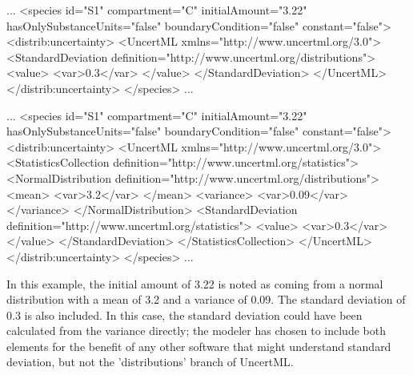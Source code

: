 \documentclass[draftspec]{sbmlpkgspec}
\newcommand{\uncertml}{UncertML\xspace}
\begin{document}
\begin{example}
...
      <species id="S1" compartment="C" initialAmount="3.22" hasOnlySubstanceUnits="false"
               boundaryCondition="false" constant="false">
        <distrib:uncertainty>
          <UncertML xmlns="http://www.uncertml.org/3.0">
            <StandardDeviation definition="http://www.uncertml.org/distributions">
              <value>
                <var>0.3</var>
              </value>
            </StandardDeviation>
          </UncertML>
        </distrib:uncertainty>
      </species>
...
\end{example}



\begin{example}
...
      <species id="S1" compartment="C" initialAmount="3.22" hasOnlySubstanceUnits="false"
               boundaryCondition="false" constant="false">
        <distrib:uncertainty>
          <UncertML xmlns="http://www.uncertml.org/3.0">
            <StatisticsCollection definition="http://www.uncertml.org/statistics">
              <NormalDistribution definition="http://www.uncertml.org/distributions">
                <mean>
                  <var>3.2</var>
                </mean>
                <variance>
                  <var>0.09</var>
                </variance>
              </NormalDistribution>
              <StandardDeviation definition="http://www.uncertml.org/statistics">
                <value>
                  <var>0.3</var>
                </value>
              </StandardDeviation>
            </StatisticsCollection>
          </UncertML>
        </distrib:uncertainty>
      </species>
...
\end{example}

In this example, the initial amount of 3.22 is noted as coming from a normal distribution with a mean of 3.2 and a variance of 0.09.  The standard deviation of 0.3 is also included.  In this case, the standard deviation could have been calculated from the variance directly; the modeler has chosen to include both elements for the benefit of any other software that might understand standard deviation, but not the 'distributions' branch of \uncertml.
\end{document}
